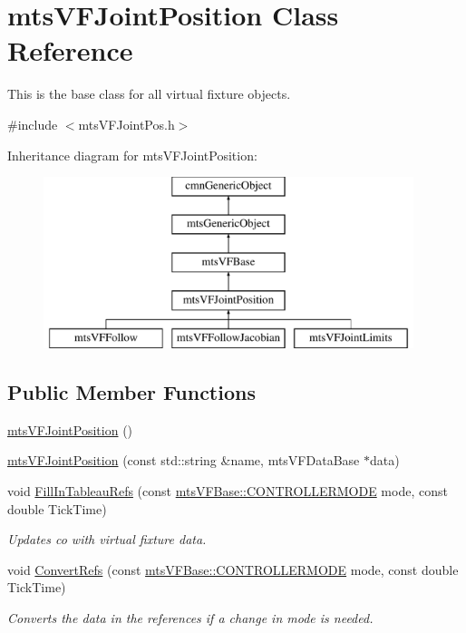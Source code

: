 \hypertarget{classmts_v_f_joint_position}{}\section{mts\+V\+F\+Joint\+Position Class Reference}
\label{classmts_v_f_joint_position}


This is the base class for all virtual fixture objects.  




{\ttfamily \#include $<$mts\+V\+F\+Joint\+Pos.\+h$>$}

Inheritance diagram for mts\+V\+F\+Joint\+Position\+:\begin{figure}[H]
\begin{center}
\leavevmode
\includegraphics[height=5.000000cm]{df/d5f/classmts_v_f_joint_position}
\end{center}
\end{figure}
\subsection*{Public Member Functions}
\begin{DoxyCompactItemize}
\item 
\hyperlink{classmts_v_f_joint_position_ad91639a817a92283cd54e06e2f560d6e}{mts\+V\+F\+Joint\+Position} ()
\item 
\hyperlink{classmts_v_f_joint_position_a0462780e99a95c87a1cf3d2a1046d5a3}{mts\+V\+F\+Joint\+Position} (const std\+::string \&name, mts\+V\+F\+Data\+Base $\ast$data)
\item 
void \hyperlink{classmts_v_f_joint_position_ac7b7a944fb075d0775cb32424f02916f}{Fill\+In\+Tableau\+Refs} (const \hyperlink{classmts_v_f_base_a742dd08f8b70bafeb746cec14d9ee974}{mts\+V\+F\+Base\+::\+C\+O\+N\+T\+R\+O\+L\+L\+E\+R\+M\+O\+D\+E} mode, const double Tick\+Time)
\begin{DoxyCompactList}\small\item\em Updates co with virtual fixture data. \end{DoxyCompactList}\item 
void \hyperlink{classmts_v_f_joint_position_ab2836af74d11806d248b146a41a448d0}{Convert\+Refs} (const \hyperlink{classmts_v_f_base_a742dd08f8b70bafeb746cec14d9ee974}{mts\+V\+F\+Base\+::\+C\+O\+N\+T\+R\+O\+L\+L\+E\+R\+M\+O\+D\+E} mode, const double Tick\+Time)
\begin{DoxyCompactList}\small\item\em Converts the data in the references if a change in mode is needed. \end{DoxyCompactList}\end{DoxyCompactItemize}
